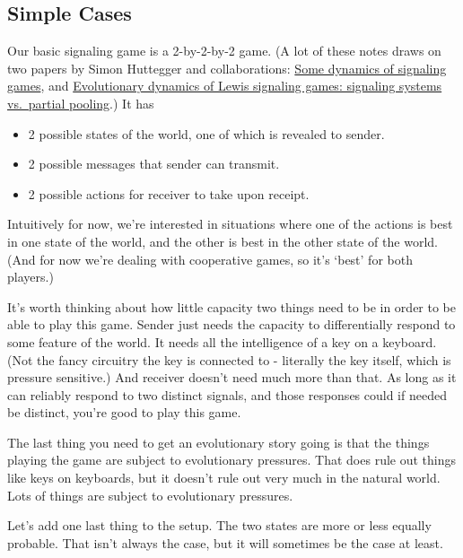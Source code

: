 \documentclass[
  11pt,
]{article}
\providecommand{\tightlist}{%
  \setlength{\itemsep}{0pt}\setlength{\parskip}{0pt}}
\begin{document}
\hypertarget{simple-cases}{%
\subsection{Simple Cases}\label{simple-cases}}

Our basic signaling game is a 2-by-2-by-2 game. (A lot of these notes
draws on two papers by Simon Huttegger and collaborations:
\href{https://www.pnas.org/content/111/Supplement_3/10873}{Some dynamics
of signaling games}, and
\href{https://faculty.sites.uci.edu/shuttegg/files/2011/03/Hutteggeral2009.pdf}{Evolutionary
dynamics of Lewis signaling games: signaling systems vs.~partial
pooling}.) It has

\begin{itemize}
\tightlist
\item
  2 possible states of the world, one of which is revealed to sender.
\item
  2 possible messages that sender can transmit.
\item
  2 possible actions for receiver to take upon receipt.
\end{itemize}

Intuitively for now, we're interested in situations where one of the
actions is best in one state of the world, and the other is best in the
other state of the world. (And for now we're dealing with cooperative
games, so it's `best' for both players.)

It's worth thinking about how little capacity two things need to be in
order to be able to play this game. Sender just needs the capacity to
differentially respond to some feature of the world. It needs all the
intelligence of a key on a keyboard. (Not the fancy circuitry the key is
connected to - literally the key itself, which is pressure sensitive.)
And receiver doesn't need much more than that. As long as it can
reliably respond to two distinct signals, and those responses could if
needed be distinct, you're good to play this game.

The last thing you need to get an evolutionary story going is that the
things playing the game are subject to evolutionary pressures. That does
rule out things like keys on keyboards, but it doesn't rule out very
much in the natural world. Lots of things are subject to evolutionary
pressures.

Let's add one last thing to the setup. The two states are more or less
equally probable. That isn't always the case, but it will sometimes be
the case at least.
\end{document}
